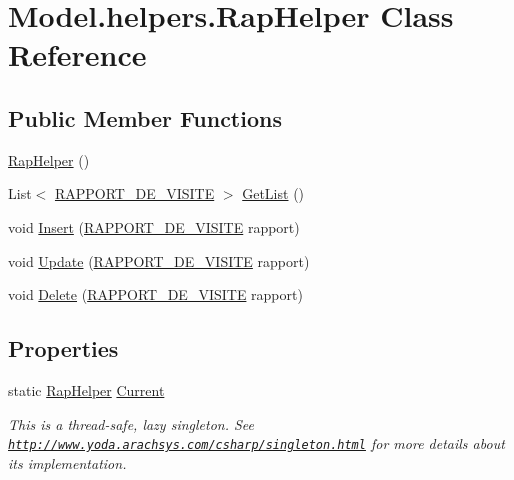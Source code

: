 \hypertarget{class_model_1_1helpers_1_1_rap_helper}{\section{Model.\-helpers.\-Rap\-Helper Class Reference}
\label{class_model_1_1helpers_1_1_rap_helper}
}
\subsection*{Public Member Functions}
\begin{DoxyCompactItemize}
\item 
\hyperlink{class_model_1_1helpers_1_1_rap_helper_a4534ffa1e232f7c2c40bb36d9326f451}{Rap\-Helper} ()
\item 
List$<$ \hyperlink{class_model_1_1_r_a_p_p_o_r_t___d_e___v_i_s_i_t_e}{R\-A\-P\-P\-O\-R\-T\-\_\-\-D\-E\-\_\-\-V\-I\-S\-I\-T\-E} $>$ \hyperlink{class_model_1_1helpers_1_1_rap_helper_a60b5aa74aaccbce4797bb65e7ac9325b}{Get\-List} ()
\item 
void \hyperlink{class_model_1_1helpers_1_1_rap_helper_a4801a3d4577efcee8e53ea48c148890b}{Insert} (\hyperlink{class_model_1_1_r_a_p_p_o_r_t___d_e___v_i_s_i_t_e}{R\-A\-P\-P\-O\-R\-T\-\_\-\-D\-E\-\_\-\-V\-I\-S\-I\-T\-E} rapport)
\item 
void \hyperlink{class_model_1_1helpers_1_1_rap_helper_a729513eb089cee1ad879529564099c5d}{Update} (\hyperlink{class_model_1_1_r_a_p_p_o_r_t___d_e___v_i_s_i_t_e}{R\-A\-P\-P\-O\-R\-T\-\_\-\-D\-E\-\_\-\-V\-I\-S\-I\-T\-E} rapport)
\item 
void \hyperlink{class_model_1_1helpers_1_1_rap_helper_a3f28310fb21724fe13830177b36ce8fa}{Delete} (\hyperlink{class_model_1_1_r_a_p_p_o_r_t___d_e___v_i_s_i_t_e}{R\-A\-P\-P\-O\-R\-T\-\_\-\-D\-E\-\_\-\-V\-I\-S\-I\-T\-E} rapport)
\end{DoxyCompactItemize}
\subsection*{Properties}
\begin{DoxyCompactItemize}
\item 
static \hyperlink{class_model_1_1helpers_1_1_rap_helper}{Rap\-Helper} \hyperlink{class_model_1_1helpers_1_1_rap_helper_a918ff1e5066a1a39e4fa53b891af545f}{Current}
\begin{DoxyCompactList}\small\item\em This is a thread-\/safe, lazy singleton. See \href{http://www.yoda.arachsys.com/csharp/singleton.html}{\tt http\-://www.\-yoda.\-arachsys.\-com/csharp/singleton.\-html} for more details about its implementation. \end{DoxyCompactList}\end{DoxyCompactItemize}



